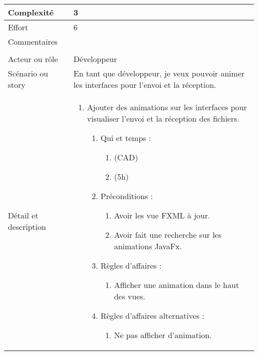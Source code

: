 \begin{longtable}{|l|p{}|}
\hline
    Complexité & 3 \\
\hline
    Effort & 6 \\
\hline
    Commentaires & \\

\hline
    \rowcolor{Gray}
    \multicolumn{2}{|l|}{3} \\
\hline
    Acteur ou rôle & Développeur \\
\hline
    Scénario ou story & En tant que développeur, je veux pouvoir animer les interfaces pour l'envoi et la réception. \\
\hline
    Détail et description &
        \begin{enumerate}[label*=\arabic*.]
            \item Ajouter des animations sur les interfaces pour visualiser l'envoi et la réception des fichiers.
                \begin{enumerate}[label*=\arabic*.]
                                \item Qui et temps :
                                \begin{enumerate}[label*=\arabic*.]
                                    \item (CAD)
                                    \item (5h)
                                \end{enumerate}
                                \item Préconditions :
                                \begin{enumerate}[label*=\arabic*.]
                                    \item Avoir les vue FXML à jour.
                                    \item Avoir fait une recherche sur les animations JavaFx.
                                \end{enumerate}
                                \item Règles d'affaires :
                                \begin{enumerate}[label*=\arabic*.]
                                    \item Afficher une animation dans le haut des vues.
                                \end{enumerate}
                                \item Règles d'affaires alternatives :
                                \begin{enumerate}[label*=\arabic*.]
                                    \item Ne pas afficher d'animation.

\end{enumerate}
\end{enumerate}
\end{enumerate}
\end{longtable}
